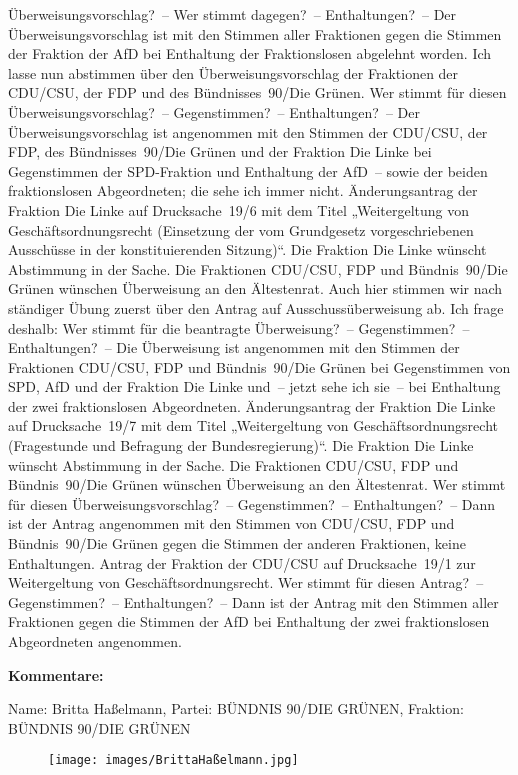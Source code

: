 \documentclass[10pt, a4paper]{report}
\begin{document}
Überweisungsvorschlag? – Wer stimmt dagegen? – Enthaltungen? – Der Überweisungsvorschlag ist mit den Stimmen aller Fraktionen gegen die Stimmen der Fraktion der AfD bei Enthaltung der Fraktionslosen abgelehnt worden. Ich lasse nun abstimmen über den Überweisungsvorschlag der Fraktionen der CDU/CSU, der FDP und des Bündnisses 90/Die Grünen. Wer stimmt für diesen Überweisungsvorschlag? – Gegenstimmen? – Enthaltungen? – Der Überweisungsvorschlag ist angenommen mit den Stimmen der CDU/CSU, der FDP, des Bündnisses 90/Die Grünen und der Fraktion Die Linke bei Gegenstimmen der SPD-Fraktion und Enthaltung der AfD – sowie der beiden fraktionslosen Abgeordneten; die sehe ich immer nicht. Änderungsantrag der Fraktion Die Linke auf Drucksache 19/6 mit dem Titel „Weitergeltung von Geschäftsordnungsrecht (Einsetzung der vom Grundgesetz vorgeschriebenen Ausschüsse in der konstituierenden Sitzung)“. Die Fraktion Die Linke wünscht Abstimmung in der Sache. Die Fraktionen CDU/CSU, FDP und Bündnis 90/Die Grünen wünschen Überweisung an den Ältestenrat. Auch hier stimmen wir nach ständiger Übung zuerst über den Antrag auf Ausschussüberweisung ab. Ich frage deshalb: Wer stimmt für die beantragte Überweisung? – Gegenstimmen? – Enthaltungen? – Die Überweisung ist angenommen mit den Stimmen der Fraktionen CDU/CSU, FDP und Bündnis 90/Die Grünen bei Gegenstimmen von SPD, AfD und der Fraktion Die Linke und – jetzt sehe ich sie – bei Enthaltung der zwei fraktionslosen Abgeordneten. Änderungsantrag der Fraktion Die Linke auf Drucksache 19/7 mit dem Titel „Weitergeltung von Geschäftsordnungsrecht (Fragestunde und Befragung der Bundesregierung)“. Die Fraktion Die Linke wünscht Abstimmung in der Sache. Die Fraktionen CDU/CSU, FDP und Bündnis 90/Die Grünen wünschen Überweisung an den Ältestenrat. Wer stimmt für diesen Überweisungsvorschlag? – Gegenstimmen? – Enthaltungen? – Dann ist der Antrag angenommen mit den Stimmen von CDU/CSU, FDP und Bündnis 90/Die Grünen gegen die Stimmen der anderen Fraktionen, keine Enthaltungen. Antrag der Fraktion der CDU/CSU auf Drucksache 19/1 zur Weitergeltung von Geschäftsordnungsrecht. Wer stimmt für diesen Antrag? – Gegenstimmen? – Enthaltungen? – Dann ist der Antrag mit den Stimmen aller Fraktionen gegen die Stimmen der AfD bei Enthaltung der zwei fraktionslosen Abgeordneten angenommen. 

\textbf{Kommentare:}

Name: Britta Haßelmann, Partei: BÜNDNIS 90/DIE GRÜNEN, Fraktion: BÜNDNIS 90/DIE GRÜNEN

\begin{figure}[!ht]
\texttt{[image: images/BrittaHaßelmann.jpg]}
\end{figure}
\end{document}
